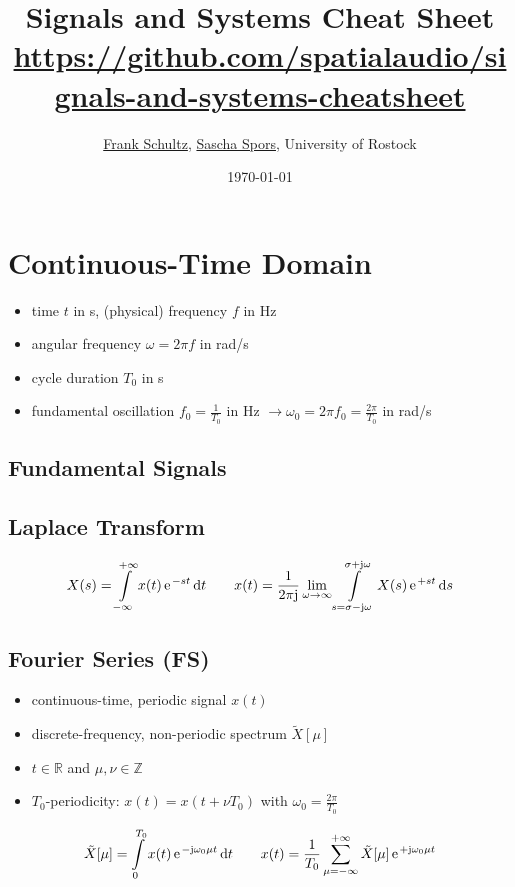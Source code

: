 \documentclass[landscape,columns=2]{cheatsheet} %
\title{Signals and Systems Cheat Sheet\\
\tiny{\url{https://github.com/spatialaudio/signals-and-systems-cheatsheet}}}
\author{
\href{https://orcid.org/0000-0002-3010-0294}{Frank Schultz},
\href{https://orcid.org/0000-0001-7225-9992}{Sascha Spors},
University of Rostock
}
\date{\today}
\begin{document}

\section{Continuous-Time Domain}
%
\begin{itemize}
\setlength\itemsep{-0.5em}
\item time $t$ in s, (physical) frequency $f$ in Hz
%
\item angular frequency $\omega = 2 \pi f$ in rad/s
%
\item cycle duration $T_0$ in s
%
\item fundamental oscillation $f_0 = \frac{1}{T_0}$ in Hz
$\rightarrow \omega_0 = 2 \pi f_0 = \frac{2\pi}{T_0}$ in rad/s
%
\end{itemize}


\subsection{Fundamental Signals}

\subsection{Laplace Transform}
%
\begin{align*}
X(s) = \int\limits_{-\infty}^{+\infty} x(t) \, \e^{-s t}\,\mathrm{d}t
\qquad
x(t) = \frac{1}{2\pi\im}\lim_{\omega\to\infty}\int\limits_{s=\sigma-\im\omega}^{\sigma+\im\omega} X(s) \,\e^{+s t}\,\mathrm{d}s
\end{align*}










\subsection{Fourier Series (FS)}
%
\begin{itemize}
\setlength\itemsep{-0.5em}
\item continuous-time, periodic signal $x(t)$
%
\item discrete-frequency, non-periodic spectrum $\tilde{X}[\mu]$
%
\item $t\in\mathbb{R}$ and $\mu,\nu\in\mathbb{Z}$
%
\item  $T_0$-periodicity: $x(t)=x(t+\nu T_0)$ with $\omega_0 = \frac{2\pi}{T_0}$
%
\end{itemize}
%
\begin{align*}
\tilde{X}[\mu] = \int\limits_{0}^{T_0} x(t) \, \e^{-\im \omega_0 \mu t}\,\mathrm{d}t
\qquad
x(t) = \frac{1}{T_0}\sum\limits_{\mu=-\infty}^{+\infty} \tilde{X}[\mu] \,\e^{+\im \omega_0 \mu t}
\end{align*}
\end{document}

